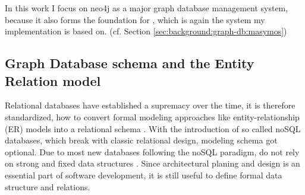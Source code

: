 In this work I focus on neo4j as a major graph database management system, because it also forms the foundation for \masymos, which is again the system my implementation is based on. (cf. Section \ref{sec:background:graph-db:masymos})

\subsection{Graph Database schema and the Entity Relation model}
\label{sec:background:graph-db:er}
Relational databases have established a supremacy over the time, it is therefore standardized, how to convert formal modeling approaches like entity-relationship (ER) models into a relational schema \cite{Saake2010,Teorey1986}. With the introduction of so called noSQL databases, which break with classic relational design, modeling schema got optional. Due to most new databases following the noSQL paradigm, do not rely on strong and fixed data structures \cite{Tudorica2011}.
Since architectural planing and design is an essential part of software development, it is still useful to define formal data structure and relations.

